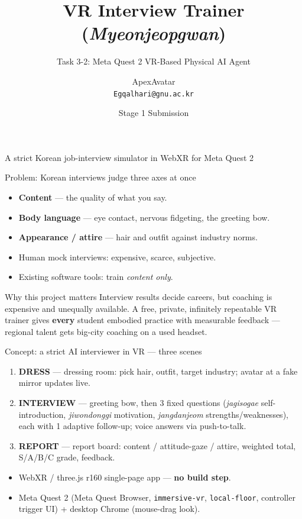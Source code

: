 \documentclass{beamer}
\title{VR Interview Trainer (\emph{Myeonjeopgwan})}
\subtitle{Task 3-2: Meta Quest 2 VR-Based Physical AI Agent}
\author{ApexAvatar \\ \texttt{Egqalhari@gnu.ac.kr}}
\institute{Glocal Project, Gyeongsang National University}
\date{Stage 1 Submission}
\begin{document}
\begin{frame}
  \titlepage
  \begin{center}\footnotesize A strict Korean job-interview simulator in WebXR for Meta Quest 2\end{center}
\end{frame}

\begin{frame}{Problem: Korean interviews judge three axes at once}
  \begin{itemize}
    \item \textbf{Content} --- the quality of what you say.
    \item \textbf{Body language} --- eye contact, nervous fidgeting, the greeting bow.
    \item \textbf{Appearance / attire} --- hair and outfit against industry norms.
  \end{itemize}
  \bigskip
  \begin{itemize}
    \item Human mock interviews: expensive, scarce, subjective.
    \item Existing software tools: train \emph{content only}.
  \end{itemize}
  \begin{block}{Why this project matters}
    \small Interview results decide careers, but coaching is expensive and unequally available. A free, private, infinitely repeatable VR trainer gives \textbf{every} student embodied practice with measurable feedback --- regional talent gets big-city coaching on a used headset.
  \end{block}
\end{frame}

\begin{frame}{Concept: a strict AI interviewer in VR --- three scenes}
  \begin{enumerate}
    \item \textbf{DRESS} --- dressing room: pick hair, outfit, target industry; avatar at a fake mirror updates live.
    \item \textbf{INTERVIEW} --- greeting bow, then 3 fixed questions (\emph{jagisogae} self-introduction, \emph{jiwondonggi} motivation, \emph{jangdanjeom} strengths/weaknesses), each with 1 adaptive follow-up; voice answers via push-to-talk.
    \item \textbf{REPORT} --- report board: content / attitude-gaze / attire, weighted total, S/A/B/C grade, feedback.
  \end{enumerate}
  \bigskip
  \begin{itemize}
    \item WebXR / three.js r160 single-page app --- \textbf{no build step}.
    \item Meta Quest 2 (Meta Quest Browser, \texttt{immersive-vr}, \texttt{local-floor}, controller trigger UI) + desktop Chrome (mouse-drag look).
  \end{itemize}
\end{frame}
\end{document}

